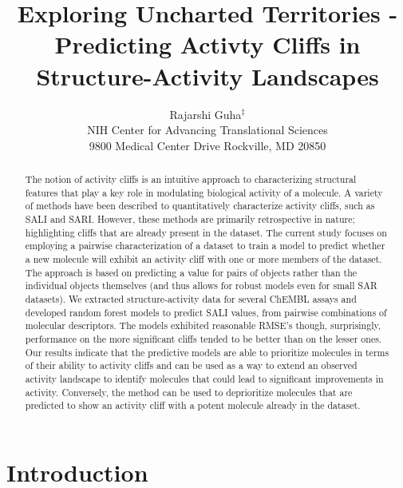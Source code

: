 \documentclass[letterpaper, 12pt]{article}
\begin{document}
\title{Exploring Uncharted Territories - Predicting Activty Cliffs in
  Structure-Activity Landscapes}
\author{Rajarshi Guha${}^{\ddagger}$\\
NIH Center for Advancing Translational Sciences \\ 9800 Medical Center Drive  Rockville, MD 20850}
\date{}

\maketitle
\begin{abstract}
  The notion of activity cliffs is an intuitive approach to characterizing structural features that
  play a key role in modulating biological activity of a molecule. A variety of methods have been
  described to quantitatively characterize activity cliffs, such as SALI and SARI. However, these
  methods are primarily retrospective in nature; highlighting cliffs that are already present in the
  dataset. The current study focuses on employing a pairwise characterization of a dataset to train
  a model to predict whether a new molecule will exhibit an activity cliff with one or more members
  of the dataset. The approach is based on predicting a value for pairs of objects rather than the
  individual objects themselves (and thus allows for robust models even for small SAR datasets). We
  extracted structure-activity data for several ChEMBL assays and developed random forest models to
  predict SALI values, from pairwise combinations of molecular descriptors. The models exhibited
  reasonable RMSE's though, surprisingly, performance on the more significant cliffs tended to be
  better than on the lesser ones. Our results indicate that the predictive models are able to
  prioritize molecules in terms of their ability to activity cliffs and can be used as a way to
  extend an observed activity landscape to identify molecules that could lead to significant
  improvements in activity. Conversely, the method can be used to deprioritize molecules that are
  predicted to show an activity cliff with a potent molecule already in the dataset.
\end{abstract}

\section{Introduction}
\end{document}
